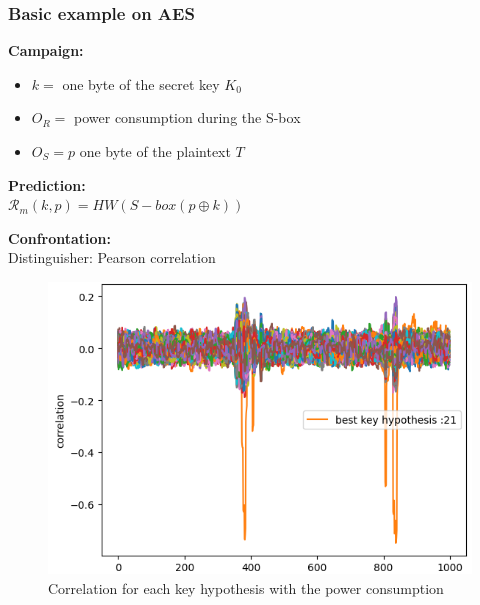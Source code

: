 \documentclass[12pt]{article}
\begin{document}
	\subsubsection{Basic example on AES}
		
			\textbf{Campaign:}\\
			\begin{itemize}
				\item $k = $ one byte of the secret key $K_0$
				\item $O_R = $ power consumption during the S-box
				\item $O_S = p$ one byte of the plaintext $T$
			\end{itemize}
			
			\textbf{Prediction:}\\
			$\mathcal{R}_m(k,p) = HW(S-box(p \oplus k))$
			
			\textbf{Confrontation:}\\
			Distinguisher: Pearson correlation
			\begin{figure}[H]
				\includegraphics[width=\textwidth]{img_files/corr_aes}
				\caption{Correlation for each key hypothesis with the power consumption}
			\end{figure}
	
\end{document}
